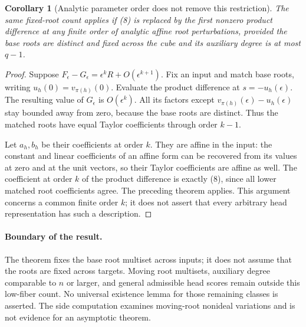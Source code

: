\documentclass[11pt]{article}
\newtheorem{corollary}[theorem]{Corollary}
\begin{document}
\begin{corollary}[Analytic parameter order does not remove this restriction]
The same fixed-root count applies if (8) is replaced by the first
nonzero product difference at any finite order of analytic affine
root perturbations, provided the base roots are distinct and fixed
across the cube and its auxiliary degree is at most $q-1$.
\end{corollary}
\begin{proof}
Suppose $F_\epsilon-G_\epsilon=\epsilon^kR+O(\epsilon^{k+1})$.
Fix an input and match base roots, writing $u_h(0)=v_{\pi(h)}(0)$.
Evaluate the product difference at $s=-u_h(\epsilon)$. The resulting
value of $G_\epsilon$ is $O(\epsilon^k)$. All its factors except
$v_{\pi(h)}(\epsilon)-u_h(\epsilon)$ stay bounded away from zero,
because the base roots are distinct. Thus the matched roots have
equal Taylor coefficients through order $k-1$.

Let $a_h,b_h$ be their coefficients at order $k$. They are affine in
the input: the constant and linear coefficients of an affine form
can be recovered from its values at zero and at the unit vectors,
so their Taylor coefficients are affine as well. The coefficient at
order $k$ of the product difference is exactly (8), since all
lower matched root coefficients agree. The preceding theorem applies.
This argument concerns a common finite order $k$; it does not assert
that every arbitrary head representation has such a description.
\end{proof}

\paragraph{Boundary of the result.}
The theorem fixes the base root multiset across inputs; it does not
assume that the roots are fixed across targets. Moving root multisets,
auxiliary degree comparable to $n$ or larger, and general admissible
head scores remain outside this low-fiber count. No universal existence
lemma for those remaining classes is asserted. The side computation
examines moving-root nonideal variations and is not evidence for an
asymptotic theorem.
\end{document}

